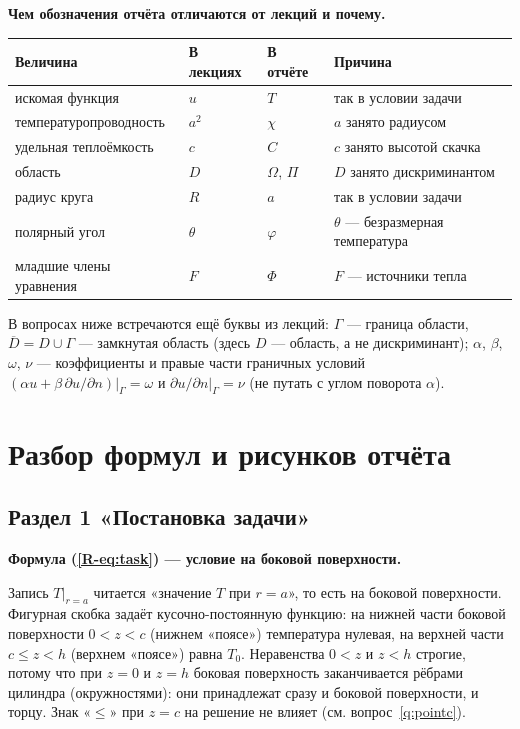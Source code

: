 \documentclass[a4paper,12pt]{article}
\renewcommand{\le}{\leqslant}
\newcommand{\rf}[1]{(\ref*{R-#1})}
\newcommand{\fhead}[2]{\par\medskip\textbf{Формула #1 — #2.}\par\nopagebreak[4]}
\begin{document}
\textbf{Чем обозначения отчёта отличаются от лекций и почему.}

\begin{longtable}{@{}>{\raggedright\arraybackslash}p{4.6cm}>{\raggedright\arraybackslash}p{2.2cm}>{\raggedright\arraybackslash}p{2.6cm}>{\raggedright\arraybackslash}p{6.2cm}@{}}
\toprule
Величина & В лекциях & В отчёте & Причина \\
\midrule
\endhead
искомая функция & $u$ & $T$ & так в условии задачи \\
температуропроводность & $a^2$ & $\chi$ & $a$ занято радиусом \\
удельная теплоёмкость & $c$ & $C$ & $c$ занято высотой скачка \\
область & $D$ & $\Omega$, $\Pi$ & $D$ занято дискриминантом \\
радиус круга & $R$ & $a$ & так в условии задачи \\
полярный угол & $\theta$ & $\varphi$ & $\theta$ — безразмерная температура \\
младшие члены уравнения & $F$ & $\Phi$ & $F$ — источники тепла \\
\bottomrule
\end{longtable}

В вопросах ниже встречаются ещё буквы из лекций: $\Gamma$ — граница
области, $\overline D=D\cup\Gamma$ — замкнутая область (здесь $D$ — область,
а не дискриминант); $\alpha$, $\beta$, $\omega$, $\nu$ — коэффициенты и
правые части граничных условий
$(\alpha u+\beta\,\partial u/\partial n)|_\Gamma=\omega$ и
$\partial u/\partial n|_\Gamma=\nu$ (не путать с углом поворота $\alpha$).

\section{Разбор формул и рисунков отчёта}
\label{sec:formulas}

\subsection{Раздел 1 «Постановка задачи»}

\fhead{\rf{eq:task}}{условие на боковой поверхности}
Запись $T|_{r=a}$ читается «значение $T$ при $r=a$», то есть на боковой
поверхности. Фигурная скобка задаёт кусочно-постоянную функцию: на нижней
части боковой поверхности $0<z<c$ (нижнем «поясе») температура нулевая, на
верхней части $c\le z<h$ (верхнем «поясе») равна $T_0$. Неравенства $0<z$
и $z<h$ строгие, потому что при $z=0$ и $z=h$ боковая поверхность
заканчивается рёбрами цилиндра (окружностями): они принадлежат сразу и
боковой поверхности, и торцу. Знак «$\le$» при $z=c$ на решение не влияет
(см. вопрос~\ref{q:pointc}).
\end{document}
